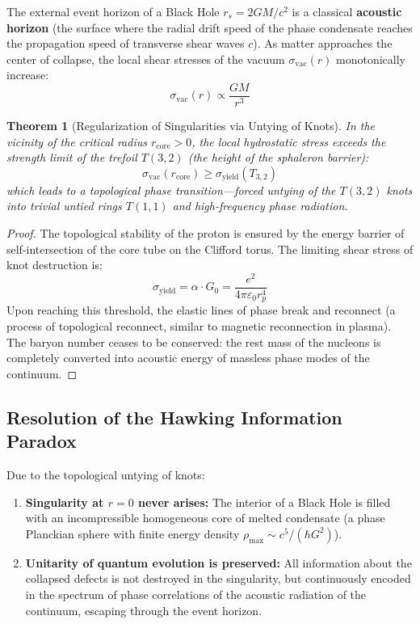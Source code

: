 \documentclass[12pt,a4paper]{article}
\newtheorem{theorem}{Theorem}
\begin{document}
		The external event horizon of a Black Hole $r_s = 2GM/c^2$ is a classical \textbf{acoustic horizon} (the surface where the radial drift speed of the phase condensate reaches the propagation speed of transverse shear waves $c$). As matter approaches the center of collapse, the local shear stresses of the vacuum $\sigma_{\text{vac}}(r)$ monotonically increase:
		\begin{equation}
			\sigma_{\text{vac}}(r) \propto \frac{G M}{r^3}
		\end{equation}
		
		\begin{theorem}[Regularization of Singularities via Untying of Knots]
			In the vicinity of the critical radius $r_{\mathrm{core}} > 0$, the local hydrostatic stress exceeds the strength limit of the trefoil $T(3,2)$ (the height of the sphaleron barrier):
			\begin{equation}
				\sigma_{\mathrm{vac}}(r_{\mathrm{core}}) \ge \sigma_{\mathrm{yield}}(T_{3,2})
			\end{equation}
			which leads to a topological phase transition—forced untying of the $T(3,2)$ knots into trivial untied rings $T(1,1)$ and high-frequency phase radiation.
		\end{theorem}
		
		\begin{proof}
			The topological stability of the proton is ensured by the energy barrier of self-intersection of the core tube on the Clifford torus. The limiting shear stress of knot destruction is:
			\begin{equation}
				\sigma_{\text{yield}} = \alpha \cdot G_0 = \frac{e^2}{4\pi\varepsilon_0 r_p^4}
			\end{equation}
			Upon reaching this threshold, the elastic lines of phase break and reconnect (a process of topological reconnect, similar to magnetic reconnection in plasma). The baryon number ceases to be conserved: the rest mass of the nucleons is completely converted into acoustic energy of massless phase modes of the continuum.
		\end{proof}
		
		\subsection{Resolution of the Hawking Information Paradox}
		Due to the topological untying of knots:
		\begin{enumerate}
			\item \textbf{Singularity at $r=0$ never arises:} The interior of a Black Hole is filled with an incompressible homogeneous core of melted condensate (a phase Planckian sphere with finite energy density $\rho_{\text{max}} \sim c^5 / (\hbar G^2)$).
			\item \textbf{Unitarity of quantum evolution is preserved:} All information about the collapsed defects is not destroyed in the singularity, but continuously encoded in the spectrum of phase correlations of the acoustic radiation of the continuum, escaping through the event horizon.
		\end{enumerate}
		
\end{document}
